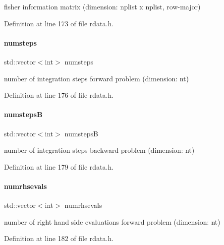 fisher information matrix (dimension\+: nplist x nplist, row-\/major) 

Definition at line 173 of file rdata.\+h.

\mbox{\label{classamici_1_1_return_data_acde98b0742196966453b28674762f58f}} 
\paragraph{\texorpdfstring{numsteps}{numsteps}}
{\footnotesize\ttfamily std\+::vector$<$int$>$ numsteps}

number of integration steps forward problem (dimension\+: nt) 

Definition at line 176 of file rdata.\+h.

\mbox{\label{classamici_1_1_return_data_ae0fffbefbc18d93f2ceecc4547a70566}} 
\paragraph{\texorpdfstring{numstepsB}{numstepsB}}
{\footnotesize\ttfamily std\+::vector$<$int$>$ numstepsB}

number of integration steps backward problem (dimension\+: nt) 

Definition at line 179 of file rdata.\+h.

\mbox{\label{classamici_1_1_return_data_a22235e961356f32e211f9b5d8499ad3b}} 
\paragraph{\texorpdfstring{numrhsevals}{numrhsevals}}
{\footnotesize\ttfamily std\+::vector$<$int$>$ numrhsevals}

number of right hand side evaluations forward problem (dimension\+: nt) 

Definition at line 182 of file rdata.\+h.

\mbox{\label{classamici_1_1_return_data_aa0eda2ffc8979d9e46d8fb2d8d3a1622}} 
